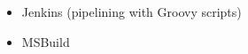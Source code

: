 \begin{multicols}{2}
	\begin{itemize}
		\item Jenkins (pipelining with Groovy scripts)
		\item MSBuild
	\end{itemize}
	\vspace*{\fill}
\end{multicols}